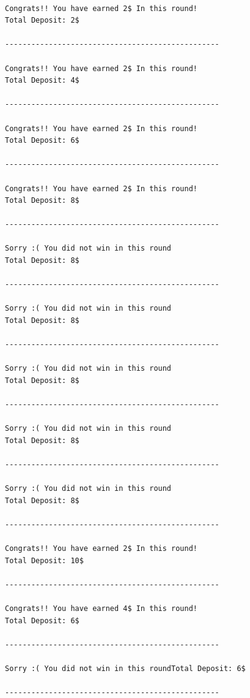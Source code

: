 \documentclass[a4paper,14pt]{article}
\begin{document}
		\begin{latin}
		\begin{lstlisting}
			
Congrats!! You have earned 2$ In this round!
Total Deposit: 2$

-------------------------------------------------

Congrats!! You have earned 2$ In this round!
Total Deposit: 4$

-------------------------------------------------

Congrats!! You have earned 2$ In this round!
Total Deposit: 6$

-------------------------------------------------

Congrats!! You have earned 2$ In this round!
Total Deposit: 8$

-------------------------------------------------

Sorry :( You did not win in this round
Total Deposit: 8$

-------------------------------------------------

Sorry :( You did not win in this round
Total Deposit: 8$

-------------------------------------------------

Sorry :( You did not win in this round
Total Deposit: 8$

-------------------------------------------------

Sorry :( You did not win in this round
Total Deposit: 8$

-------------------------------------------------

Sorry :( You did not win in this round
Total Deposit: 8$

-------------------------------------------------

Congrats!! You have earned 2$ In this round!
Total Deposit: 10$

-------------------------------------------------

Congrats!! You have earned 4$ In this round!
Total Deposit: 6$

-------------------------------------------------

Sorry :( You did not win in this roundTotal Deposit: 6$

-------------------------------------------------
			
		\end{lstlisting}
	\end{latin}
\end{document}
